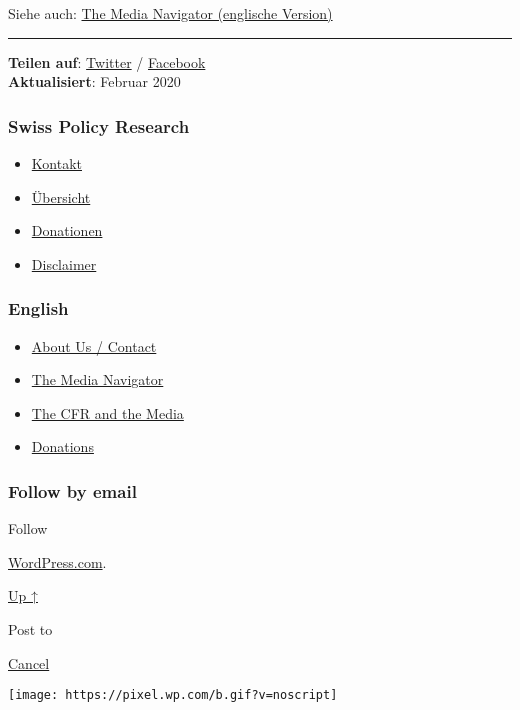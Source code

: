 Siehe auch: \href{https://swprs.org/media-navigator/}{The Media
Navigator (englische Version)}

\begin{center}\rule{0.5\linewidth}{\linethickness}\end{center}

\textbf{Teilen auf}:
\href{https://twitter.com/intent/tweet?url=https://swprs.org/medien-navigator/}{Twitter}
/
\href{https://www.facebook.com/share.php?u=https://swprs.org/medien-navigator/}{Facebook}\\
\textbf{Aktualisiert}: Februar 2020

\hypertarget{swiss-policy-research}{%
\subsubsection{Swiss Policy Research}\label{swiss-policy-research}}

\begin{itemize}
\tightlist
\item
  \href{https://swprs.org/kontakt/}{Kontakt}
\item
  \href{https://swprs.org/uebersicht/}{Übersicht}
\item
  \href{https://swprs.org/donationen/}{Donationen}
\item
  \href{https://swprs.org/disclaimer/}{Disclaimer}
\end{itemize}

\hypertarget{english}{%
\subsubsection{English}\label{english}}

\begin{itemize}
\tightlist
\item
  \href{https://swprs.org/contact/}{About Us / Contact}
\item
  \href{https://swprs.org/media-navigator/}{The Media Navigator}
\item
  \href{https://swprs.org/the-american-empire-and-its-media/}{The CFR
  and the Media}
\item
  \href{https://swprs.org/donations/}{Donations}
\end{itemize}

\hypertarget{follow-by-email}{%
\subsubsection{Follow by email}\label{follow-by-email}}

Follow

\href{https://wordpress.com/?ref=footer_custom_com}{WordPress.com}.

\protect\hyperlink{}{Up ↑}

Post to

\protect\hyperlink{}{Cancel}

\texttt{[image: https://pixel.wp.com/b.gif?v=noscript]}
